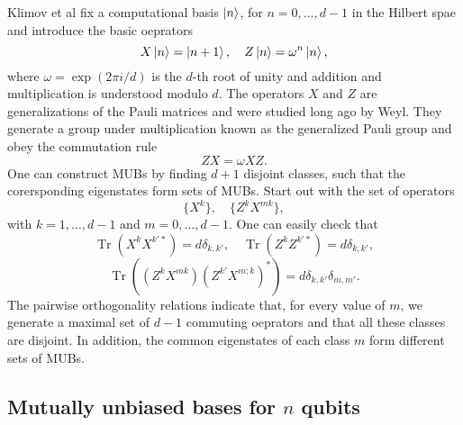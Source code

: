 \documentclass[a4paper]{article}
\DeclareMathOperator{\Tr}{Tr}
\begin{document}
  Klimov et al fix a computational basis $\ket n$, for $n =
  0,\ldots,d-1$ in the Hilbert spae and introduce the basic
  oeprators
  \[
    X\ket n = \ket{n+1},
    \quad
    Z\ket n = \omega^{n}\ket n,
  \]  
  where $\omega = \exp(2\pi i / d)$ is the $d$-th root of
  unity and addition and multiplication is understood modulo
  $d$. The operators $X$ and $Z$ are generalizations of the
  Pauli matrices and were studied long ago by Weyl. They
  generate a group under multiplication known as the
  generalized Pauli group and obey the commutation rule
  \[
    ZX = \omega XZ.
  \] 
  One can construct MUBs by finding $d+1$ disjoint classes,
  such that the corersponding eigenstates form sets of MUBs.
  Start out with the set of operators
  \[
    \{X^{k}\}, \quad \{Z^{k}X^{m k}\},
  \] 
  with $k = 1,\ldots,d-1$ and $m = 0,\ldots,d-1$. One can
  easily check that
  \[
    \Tr\left( X^{k}X^{k'*} \right) = d\delta_{k,k'},
    \quad 
    \Tr\left( Z^{k}Z^{k'*} \right) = d\delta_{k,k'},
  \] 
  \[
    \Tr\left( (Z^{k}X^{m k})(Z^{k'}X^{m;k})^{*} \right) 
    = d\delta_{k,k'}\delta_{m,m'}.
  \] 
  The pairwise orthogonality relations indicate that, for
  every value of $m$, we generate a maximal set of $d-1$ 
  commuting oeprators and that all these classes are
  disjoint. In addition, the common eigenstates of each
  class $m$ form different sets of MUBs.

  \subsection{Mutually unbiased bases for $n$ qubits}
\end{document}
